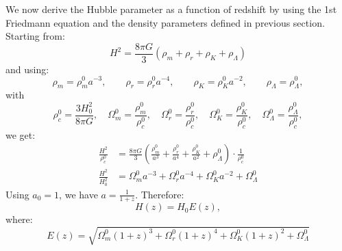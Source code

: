 \begin{foundation}
    We now derive the Hubble parameter as a function of redshift by using the 1st Friedmann equation and the density parameters defined in previous section.
    Starting from:
    \[
        H^2 = \frac{8\pi G}{3}(\rho_m + \rho_r + \rho_K + \rho_\Lambda)
    \]
    and using:
    \[
        \rho_m = \rho_m^0 a^{-3}, \qquad \rho_r = \rho_r^0 a^{-4}, \qquad \rho_K = \rho_K^0 a^{-2}, \qquad \rho_\Lambda = \rho_\Lambda^0,
    \]
    with
    \[
        \rho_c^0 = \frac{3H_0^2}{8\pi G},
        \quad
        \Omega_m^0 = \frac{\rho_m^0}{\rho_c^0},
        \quad
        \Omega_r^0 = \frac{\rho_r^0}{\rho_c^0},
        \quad
        \Omega_K^0 = \frac{\rho_K^0}{\rho_c^0},
        \quad
        \Omega_\Lambda^0 = \frac{\rho_\Lambda^0}{\rho_c^0},
    \]
    we get:
    \begin{align*}
        \frac{H^2}{\rho_c^0} &= \frac{8\pi G}{3} \left( \frac{\rho_m^0}{a^3} + \frac{\rho_r^0}{a^4} + \frac{\rho_K^0}{a^2} + \rho_\Lambda^0 \right) \cdot \frac{1}{\rho_c^0} \\
        \frac{H^2}{H_0^2} &= \Omega_m^0 a^{-3} + \Omega_r^0 a^{-4} + \Omega_K^0 a^{-2} + \Omega_\Lambda^0 
    \end{align*}
    Using $a_0 = 1$, we have $a = \frac{1}{1+z}$. Therefore:
    \[
        H(z) = H_0 E(z) ,
    \]
    where:
    \[
        E(z) = \sqrt{\Omega_m^0 (1+z)^3 + \Omega_r^0 (1+z)^4 + \Omega_K^0 (1+z)^2 + \Omega_\Lambda^0}
    \]
\end{foundation}

